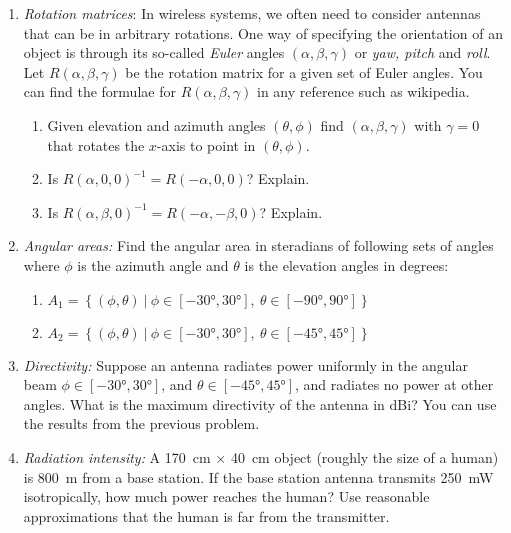 \documentclass[11pt]{article}
\begin{document}
\begin{enumerate}
\item \emph{Rotation matrices}:  In wireless systems, we often need to consider antennas that
can be in arbitrary rotations.  One way of specifying the orientation of an object
is through its so-called \emph{Euler} angles $(\alpha,\beta,\gamma)$ or
\emph{yaw, pitch} and \emph{roll}.  Let $R(\alpha,\beta,\gamma)$ be the rotation matrix
for a given set of Euler angles.  You can find the formulae for $R(\alpha,\beta,\gamma)$
in any reference such as wikipedia.
\begin{enumerate}[label=(\alph*)]

\item Given elevation and azimuth angles $(\theta,\phi)$ find $(\alpha,\beta,\gamma)$
with $\gamma=0$ that rotates the $x$-axis to point in $(\theta,\phi)$.
\item Is $R(\alpha,0,0)^{-1} = R(-\alpha,0,0)$?  Explain.
\item Is $R(\alpha,\beta,0)^{-1} = R(-\alpha,-\beta,0)$?  Explain.
\end{enumerate}

\item \emph{Angular areas:}  Find the angular area in steradians of
following sets of angles where $\phi$ is the azimuth angle and $\theta$ is the elevation angles
in degrees:
\begin{enumerate}[label=(\alph*)]
  \item $A_1 = \left\{ (\phi,\theta) ~ | ~ \phi \in [-\ang{30},\ang{30}],~ \theta \in [-\ang{90},\ang{90}]\right\}$
  \item $A_2 = \left\{ (\phi,\theta) ~|~ \phi \in [-\ang{30},\ang{30}],~ \theta \in [-\ang{45},\ang{45}]\right\}$
\end{enumerate}
\item \emph{Directivity:}  Suppose an antenna radiates power uniformly in
the angular beam $\phi \in [-\ang{30},\ang{30}]$, and $\theta \in [-\ang{45},\ang{45}]$,
and radiates no power at other angles.  What is the maximum directivity of the antenna in dBi?
You can use the results from the previous problem.


\item \emph{Radiation intensity:}  A \SI{170}{cm} $\times$ \SI{40}{cm} object
(roughly the size of a human) is \SI{800}{m} from a base station.
If the base station antenna transmits \SI{250}{mW} isotropically, how much power
reaches the human?  Use reasonable approximations that the human is far from the
transmitter.


\end{enumerate}
\end{document}
